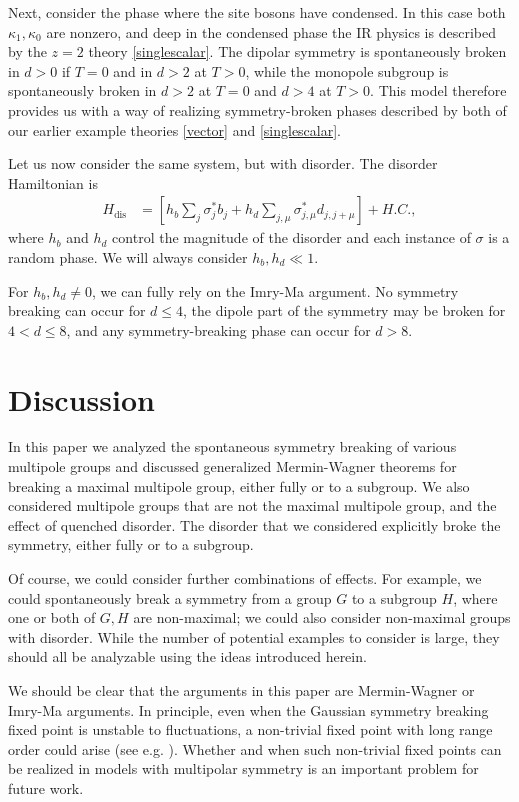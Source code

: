 \documentclass[pra,aps,twocolumn, amsfonts,amsmath,amssymb,nofootinbib,superscriptaddress]{revtex4-2}
\begin{document}
Next, consider the phase where the site bosons have condensed. In this case both $\kappa_1,\kappa_0$ are nonzero, and deep in the condensed phase the IR physics is described by the $z=2$ theory \eqref{singlescalar}. The dipolar symmetry is spontaneously broken in $d>0$ if $T=0$ and in $d>2$ at $T>0$, while the monopole subgroup is spontaneously broken in $d>2$ at $T=0$ and $d>4$ at $T>0$. This model therefore provides us with a way of realizing symmetry-broken phases described by both of our earlier example theories \eqref{vector} and \eqref{singlescalar}.

Let us now consider the same system, but with disorder.  The disorder Hamiltonian is
\begin{align}
H_\text{dis} &= \left[h_b\sum_j \sigma^*_jb_j + h_d \sum_{j,\mu} \sigma^*_{j,\mu}d_{j,j+\mu}\right] + H.C.,
\end{align}
where $h_b$ and $h_d$ control the magnitude of the disorder and each instance of $\sigma$ is a random phase. We will always consider $h_b,h_d\ll1$.

For $h_b,h_d\ne 0$, we can fully rely on the Imry-Ma argument. No symmetry breaking can occur for $d\le 4$, the dipole part of the symmetry may be broken for $4<d\le 8$, and any symmetry-breaking phase can occur for $d>8$. 

\section{Discussion} \label{sec:disc}

In this paper we analyzed the spontaneous symmetry breaking of various multipole groups and discussed generalized Mermin-Wagner theorems for breaking a maximal multipole group, either fully or to a subgroup. We also considered multipole groups that are not the maximal multipole group, and the effect of quenched disorder. The disorder that we considered explicitly broke the symmetry, either fully or to a subgroup.

Of course, we could consider further combinations of effects. For example, we could spontaneously break a symmetry from a group $G$ to a subgroup $H$, where one or both of $G,H$ are non-maximal; we could also consider non-maximal groups with disorder. While the number of potential examples to consider is large, they should all be analyzable using the ideas introduced herein. 

We should be clear that the arguments in this paper are Mermin-Wagner or Imry-Ma arguments. 
In principle, even when the Gaussian symmetry breaking fixed point is unstable to fluctuations, a non-trivial fixed point with long range order could arise (see e.g. \cite{TonerRadzihovsky}). Whether and when such non-trivial fixed points can be realized in models with multipolar symmetry is an important problem for future work. 
\end{document}
